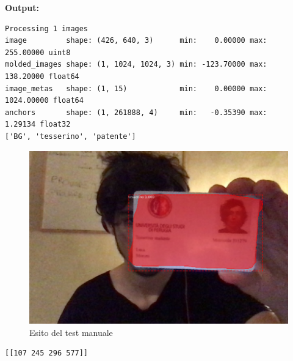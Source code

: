 \documentclass[12pt,a4paper]{article}
\begin{document}
\textbf{\large Output:}

\begin{verbatim}
Processing 1 images
image         shape: (426, 640, 3)      min:    0.00000 max:  255.00000 uint8
molded_images shape: (1, 1024, 1024, 3) min: -123.70000 max:  138.20000 float64
image_metas   shape: (1, 15)            min:    0.00000 max: 1024.00000 float64
anchors       shape: (1, 261888, 4)     min:   -0.35390 max:    1.29134 float32
['BG', 'tesserino', 'patente']
\end{verbatim}

\begin{figure}[H]
    \caption{Esito del test manuale}
    \centering
    \includegraphics[width=\textwidth,height=\textheight,keepaspectratio]{document_recognition_29_1.png}
\end{figure}

\begin{verbatim}
[[107 245 296 577]]
\end{verbatim}

\pagebreak
\listoffigures
\listoflistings
\end{document}
